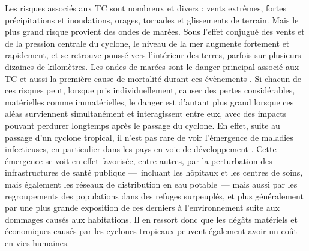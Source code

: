 \documentclass[../main.tex]{subfiles}
\begin{document}
Les risques associés aux TC sont nombreux et divers : vents extrêmes, fortes précipitations et inondations, orages, tornades et glissements de terrain. Mais le plus grand risque provient des ondes de marées. Sous l'effet conjugué des vents et de la pression centrale du cyclone, le niveau de la mer augmente fortement et rapidement, et se retrouve poussé vers l'intérieur des terres, parfois sur
plusieurs dizaines de kilomètres. Les ondes de marées
sont le danger principal associé aux TC et aussi la première cause de mortalité durant ces évènements \parencite{needham_review_2015}. Si chacun de ces risques peut, lorsque pris individuellement, causer des pertes considérables, matérielles comme immatérielles, le danger est d'autant plus grand lorsque ces aléas surviennent simultanément et interagissent entre eux, avec des impacts pouvant perdurer longtemps après le passage du cyclone. En effet, suite au passage d'un cyclone tropical, il n'est pas rare de voir l'émergence de maladies infectieuses, en
particulier dans les pays en voie de développement \parencite{shultz_epidemiology_2005}. Cette émergence se voit en effet favorisée, entre autres, par la perturbation des infrastructures de santé publique ---~incluant les hôpitaux et les centres de soins, mais également les réseaux de distribution en eau potable~--- mais aussi par les regroupements des populations dans des refuges surpeuplés, et plus généralement par une plus grande exposition de ces derniers à l'environnement suite aux dommages causés aux
habitations. Il en ressort donc que les dégâts matériels et économiques causés par les cyclones tropicaux peuvent également avoir un coût en vies humaines.
\end{document}

